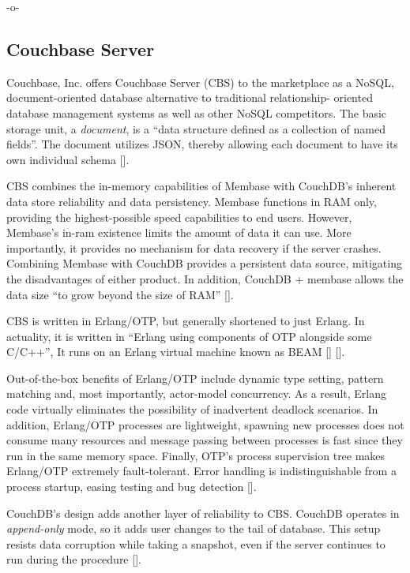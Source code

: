      -o-

\subsection{Couchbase Server}


Couchbase, Inc. offers Couchbase Server (CBS) to the marketplace as a
NoSQL, document-oriented database alternative to traditional
relationship- oriented database management systems as well as other
NoSQL competitors.  The basic storage unit, a \textit{document}, is a ``data
structure defined as a collection of named fields''.  The document
utilizes JSON, thereby allowing each document to have its own
individual schema [\cite{www-infoworld-cbs}].

CBS combines the in-memory capabilities of Membase with CouchDB's
inherent data store reliability and data persistency.  Membase
functions in RAM only, providing the highest-possible speed
capabilities to end users.  However, Membase's in-ram existence limits
the amount of data it can use.  More importantly, it provides no
mechanism for data recovery if the server crashes.  Combining Membase
with CouchDB provides a persistent data source, mitigating the
disadvantages of either product.  In addition, CouchDB + membase
allows the data size ``to grow beyond the size of RAM''
 [\cite{www-safaribooks-cbs}].

CBS is written in Erlang/OTP, but generally shortened to just Erlang.
In actuality, it is written in ``Erlang using components of OTP
alongside some C/C++'', It runs on an Erlang virtual machine known as
BEAM [\cite{www-wikipedia-erlang-cbs}] [\cite{www-erlangcentral-cbs}].

Out-of-the-box benefits of Erlang/OTP include dynamic type setting,
pattern matching and, most importantly, actor-model concurrency.  As a
result, Erlang code virtually eliminates the possibility of
inadvertent deadlock scenarios.  In addition, Erlang/OTP processes are
lightweight, spawning new processes does not consume many resources
and message passing between processes is fast since they run in the
same memory space.  Finally, OTP's process supervision tree makes
Erlang/OTP extremely fault-tolerant.  Error handling is
indistinguishable from a process startup, easing testing and bug
detection [\cite{www-couchbase-blog-cbs}].

CouchDB's design adds another layer of reliability to CBS.  CouchDB
operates in \textit{append-only} mode, so it adds user changes to the tail of
database.  This setup resists data corruption while taking a snapshot,
even if the server continues to run during the
procedure [\cite{www-hightower-cbs}].


